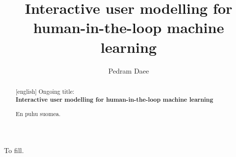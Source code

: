\documentclass[dissertation,math,vertlayout,pdfa,colorlinks]{aaltoseries}
\author{Pedram Daee}
\title{Interactive user modelling for human-in-the-loop machine learning} %
\begin{document}





\begin{abstract}[english]
	Ongoing title: \\
	\textbf{Interactive user modelling for human-in-the-loop machine learning}
\end{abstract}



 
\begin{abstract}%
En puhu suomea.
\end{abstract}




\begin{preface}[Espoo]
To fill.

\end{preface}

\clearpage
\tableofcontents

\end{document}
